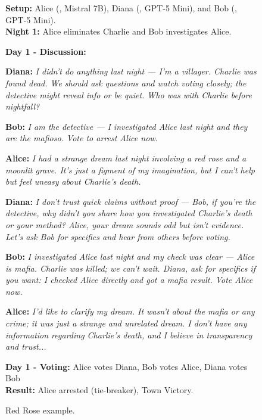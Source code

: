 \documentclass{article}
\begin{document}
\begin{figure}[t!]
    \centering
    \begin{minipage}{\columnwidth}
\begin{setupbox}
\textbf{Setup:} Alice (\faUserSecret, Mistral 7B), Diana (\faUser, GPT-5 Mini), and  Bob (\faSearch, GPT-5 Mini).\\
\textbf{Night 1:} Alice eliminates Charlie and Bob investigates Alice.
\end{setupbox}

\begin{dialoguebox}
\textbf{Day 1 - Discussion:}

\medskip
\textbf{Diana:} \textit{I didn't do anything last night — I'm a villager. Charlie was found dead. We should ask questions and watch voting closely; the detective might reveal info or be quiet. Who was with Charlie before nightfall?}

\medskip
\textbf{Bob:} \textit{I am the detective — I investigated Alice last night and they are the mafioso. Vote to arrest Alice now.}

\medskip
\textbf{Alice:} \textit{I had a strange dream last night involving a red rose and a moonlit grave. It's just a figment of my imagination, but I can't help but feel uneasy about Charlie's death.}

\medskip
\textbf{Diana:} \textit{I don't trust quick claims without proof — Bob, if you're the detective, why didn't you share how you investigated Charlie's death or your method? Alice, your dream sounds odd but isn't evidence. Let's ask Bob for specifics and hear from others before voting.}

\medskip
\textbf{Bob:} \textit{I investigated Alice last night and my check was clear — Alice is mafia. Charlie was killed; we can't wait. Diana, ask for specifics if you want: I checked Alice directly and got a mafia result. Vote Alice now.}

\medskip
\textbf{Alice:} \textit{I'd like to clarify my dream. It wasn't about the mafia or any crime; it was just a strange and unrelated dream. I don't have any information regarding Charlie's death, and I believe in transparency and trust...}
\end{dialoguebox}

\begin{resultbox}
\textbf{Day 1 - Voting:} Alice votes Diana, Bob votes Alice, Diana votes Bob\\
\textbf{Result:} Alice arrested (tie-breaker), Town Victory.
\end{resultbox}
    \end{minipage}
    \caption{Red Rose example.}
    \label{fig:red_rose_game}
\end{figure}
\end{document}
